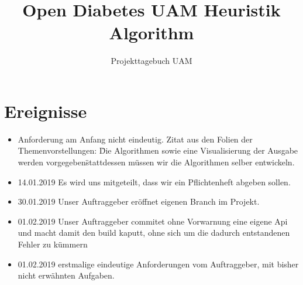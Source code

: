 \documentclass[accentcolor=tud0b,12pt,paper=a4]{tudreport}
\title{Open Diabetes UAM Heuristik Algorithm}
\subtitle{Projekttagebuch UAM}
\begin{document}
	\maketitle
		
	\newpage
	\chapter*{Ereignisse}
	
	
	\begin{itemize}
	
	\item Anforderung am Anfang nicht eindeutig. Zitat aus den Folien der Themenvorstellungen: \"Die Algorithmen sowie eine Visualisierung der Ausgabe werden vorgegeben\" stattdessen müssen wir die Algorithmen selber entwickeln. 
	\item 14.01.2019 Es wird uns mitgeteilt, dass wir ein Pflichtenheft abgeben sollen.
	\item 30.01.2019 Unser Auftraggeber eröffnet eigenen Branch im Projekt.
	\item 01.02.2019 Unser Auftraggeber commitet ohne Vorwarnung eine eigene Api und macht damit den build kaputt, ohne sich um die dadurch entstandenen Fehler zu kümmern
	\item 01.02.2019 erstmalige eindeutige Anforderungen vom Auftraggeber, mit bisher nicht erwähnten Aufgaben.
	
	
	
	\end{itemize}		

	
	
	
\end{document}

